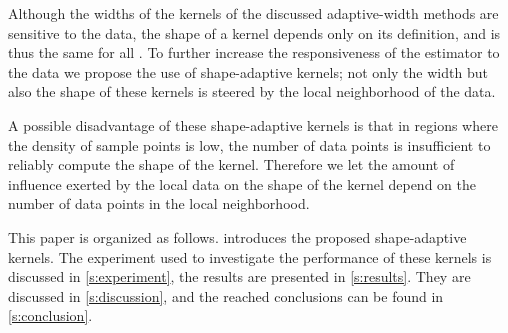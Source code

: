 	Although the widths of the kernels of the discussed adaptive-width methods are sensitive to the data, the shape of a kernel depends only on its definition, and is thus the same for all \varPattern[\itXis]. To further increase the responsiveness of the estimator to the data we propose the use of shape-adaptive kernels; not only the width but also the shape of these kernels is steered by the local neighborhood of the data.

	A possible disadvantage of these shape-adaptive kernels is that in regions where the density of sample points is low, the number of data points is insufficient to reliably compute the shape of the kernel. Therefore we let the amount of influence exerted by the local data on the shape of the kernel depend on the number of data points in the local neighborhood.

	This paper is organized as follows.  introduces the proposed shape-adaptive kernels. The experiment used to investigate the performance of these kernels is discussed in \cref{s:experiment}, the results are presented in \cref{s:results}. They are discussed in \cref{s:discussion}, and the reached conclusions can be found in \cref{s:conclusion}.